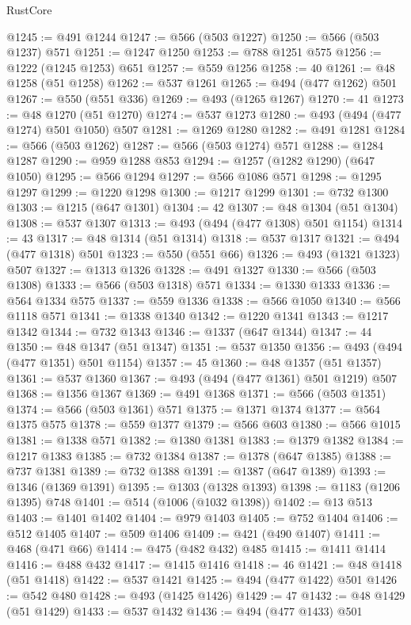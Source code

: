 \begin{lexlean}{RustCore}
\begin{coremodule}
@1245 := @491 @1244
@1247 := @566 (@503 @1227)
@1250 := @566 (@503 @1237) @571
@1251 := @1247 @1250
@1253 := @788 @1251 @575
@1256 := @1222 (@1245 @1253) @651
@1257 := @559 @1256
@1258 := 40
@1261 := @48 @1258 (@51 @1258)
@1262 := @537 @1261
@1265 := @494 (@477 @1262) @501
@1267 := @550 (@551 @336)
@1269 := @493 (@1265 @1267)
@1270 := 41
@1273 := @48 @1270 (@51 @1270)
@1274 := @537 @1273
@1280 := @493 (@494 (@477 @1274) @501 @1050) @507
@1281 := @1269 @1280
@1282 := @491 @1281
@1284 := @566 (@503 @1262)
@1287 := @566 (@503 @1274) @571
@1288 := @1284 @1287
@1290 := @959 @1288 @853
@1294 := @1257 (@1282 @1290) (@647 @1050)
@1295 := @566 @1294
@1297 := @566 @1086 @571
@1298 := @1295 @1297
@1299 := @1220 @1298
@1300 := @1217 @1299
@1301 := @732 @1300
@1303 := @1215 (@647 @1301)
@1304 := 42
@1307 := @48 @1304 (@51 @1304)
@1308 := @537 @1307
@1313 := @493 (@494 (@477 @1308) @501 @1154)
@1314 := 43
@1317 := @48 @1314 (@51 @1314)
@1318 := @537 @1317
@1321 := @494 (@477 @1318) @501
@1323 := @550 (@551 @66)
@1326 := @493 (@1321 @1323) @507
@1327 := @1313 @1326
@1328 := @491 @1327
@1330 := @566 (@503 @1308)
@1333 := @566 (@503 @1318) @571
@1334 := @1330 @1333
@1336 := @564 @1334 @575
@1337 := @559 @1336
@1338 := @566 @1050
@1340 := @566 @1118 @571
@1341 := @1338 @1340
@1342 := @1220 @1341
@1343 := @1217 @1342
@1344 := @732 @1343
@1346 := @1337 (@647 @1344)
@1347 := 44
@1350 := @48 @1347 (@51 @1347)
@1351 := @537 @1350
@1356 := @493 (@494 (@477 @1351) @501 @1154)
@1357 := 45
@1360 := @48 @1357 (@51 @1357)
@1361 := @537 @1360
@1367 := @493 (@494 (@477 @1361) @501 @1219) @507
@1368 := @1356 @1367
@1369 := @491 @1368
@1371 := @566 (@503 @1351)
@1374 := @566 (@503 @1361) @571
@1375 := @1371 @1374
@1377 := @564 @1375 @575
@1378 := @559 @1377
@1379 := @566 @603
@1380 := @566 @1015
@1381 := @1338 @571
@1382 := @1380 @1381
@1383 := @1379 @1382
@1384 := @1217 @1383
@1385 := @732 @1384
@1387 := @1378 (@647 @1385)
@1388 := @737 @1381
@1389 := @732 @1388
@1391 := @1387 (@647 @1389)
@1393 := @1346 (@1369 @1391)
@1395 := @1303 (@1328 @1393)
@1398 := @1183 (@1206 @1395) @748
@1401 := @514 (@1006 (@1032 @1398))
@1402 := @13 @513
@1403 := @1401 @1402
@1404 := @979 @1403
@1405 := @752 @1404
@1406 := @512 @1405
@1407 := @509 @1406
@1409 := @421 (@490 @1407)
@1411 := @468 (@471 @66)
@1414 := @475 (@482 @432) @485
@1415 := @1411 @1414
@1416 := @488 @432
@1417 := @1415 @1416
@1418 := 46
@1421 := @48 @1418 (@51 @1418)
@1422 := @537 @1421
@1425 := @494 (@477 @1422) @501
@1426 := @542 @480
@1428 := @493 (@1425 @1426)
@1429 := 47
@1432 := @48 @1429 (@51 @1429)
@1433 := @537 @1432
@1436 := @494 (@477 @1433) @501

\end{coremodule}
\end{lexlean}
